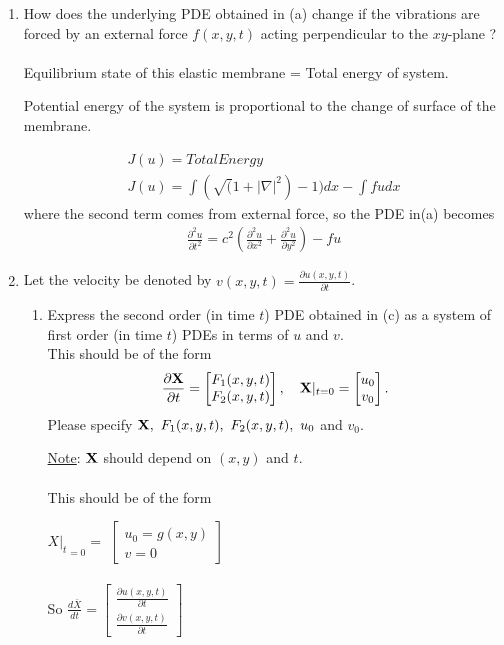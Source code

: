 \documentclass[12pt]{article}
\begin{document}
\begin{enumerate}[{\bf I.}]
\begin{enumerate}
 
 
\item  How does the underlying PDE obtained in (a) change if the vibrations are forced by an external force $f(x,y,t)$ acting perpendicular to the $xy$-plane ?
\\\\
Equilibrium state of this elastic membrane = Total energy of system.

Potential energy of the system is proportional to the change of surface of the membrane.

\begin{align}
J(u) = Total Energy
\\J(u) = \int(\sqrt(1+|\nabla|^2) -1)dx - \int fudx
\end{align}
  where the second term comes from external force, so the PDE in(a) becomes
\begin{align}
\frac{\partial^2 u}{\partial t^2} = c^2 (\frac{\partial^2 u}{\partial x^2} + \frac{\partial^2 u}{\partial y^2}) -fu
\end{align}

\item Let the velocity be denoted by $v(x,y,t)=\frac{\partial u(x,y,t)}{\partial t}$.  

 
\begin{enumerate}
\item Express the second order (in time $t$) PDE obtained in (c) as a system of first order (in time $t$) PDEs in terms of $u$ and $v$. \\
This should be of the form 
\begin{align}
\label{time_firstorder}
\frac{\partial \bf X}{\partial t} = \begin{bmatrix}
F_1(x,y,t)\\
F_2(x,y,t)
\end{bmatrix},
\quad {\bf X}|_{t=0}=\begin{bmatrix}
u_0\\
v_0
\end{bmatrix}.
\end{align}
Please specify ${\bf X}, \ F_1(x,y,t), \ F_2(x,y,t), \  u_0$ and $v_0$.


{\underline{Note}:} ${\bf X}$ should depend on $(x,y)$ and $t$. 
\\\\
This should be of the form

${X|_t}_{=0} =$
$
\begin{bmatrix}
	u_0 = g(x,y)\\ v =0
\end{bmatrix}
$
\\\\ So $\frac{d\bar X}{dt} =\begin{bmatrix}
	\frac{\partial u(x,y,t)}{\partial t}\\ \frac{\partial v(x,y,t)}{\partial t}
\end{bmatrix}
$



\end{enumerate}
\end{enumerate}
\end{enumerate}
\end{document}
